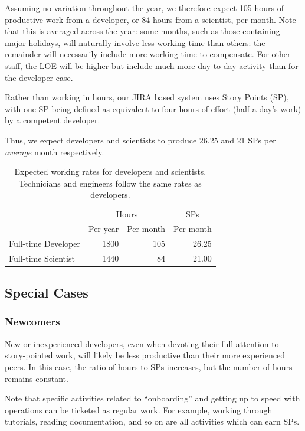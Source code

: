 Assuming no variation throughout the year, we therefore expect 105 hours of productive work from a developer, or 84 hours from a scientist, per month.
Note that this is averaged across the year: some months, such as those containing major holidays, will naturally involve less working time than others: the remainder will necessarily include more working time to compensate. For other staff, the \gls{LOE} will be higher but include much more day to day activity than for the developer case.

Rather than working in hours, our \gls{JIRA} based system uses Story Points (\gls{SP}), with one \gls{SP} being defined as equivalent to four hours of effort (half a day's work) by a competent developer.

Thus, we expect developers and scientists to produce 26.25 and 21 \glspl{SP} per \emph{average} month respectively.

\begin{table}
\begin{longtable}[]{@{}lrrr@{}}
\hline
          & \multicolumn{2}{c}{Hours} & \multicolumn{1}{c}{\glspl{SP}} \\
          & Per year & Per month      & Per month \\
\hline
Full-time Developer & 1800     & 105            & 26.25 \\
Full-time Scientist & 1440     &  84            & 21.00 \\
\hline
\end{longtable}
\caption{Expected working rates for developers and scientists. Technicians and engineers follow the same rates as developers.}
\label{tab:working-rate}
\end{table}

\subsection{Special Cases}

\subsubsection{Newcomers}
\label{sec:newcomers}

New or inexperienced developers, even when devoting their full attention to \gls{story}-pointed work, will likely be less productive than their more experienced peers.
In this case, the ratio of hours to \glspl{SP} increases, but the number of hours remains constant.

Note that specific activities related to ``onboarding'' and getting up to speed with operations can be ticketed as regular work.
For example, working through tutorials, reading documentation, and so on are all activities which can earn \glspl{SP}.

